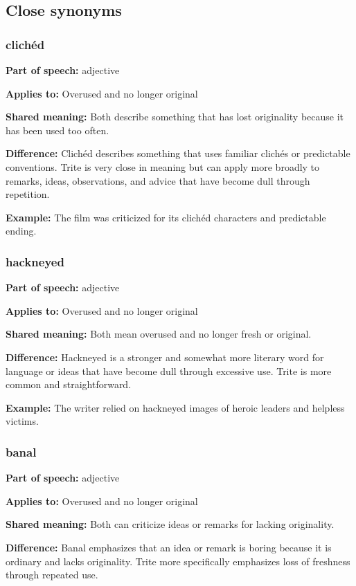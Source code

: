 \documentclass[11pt]{article}
\begin{document}
\subsection{Close synonyms}
\subsubsection{clichéd}
\textbf{Part of speech:} adjective

\textbf{Applies to:} Overused and no longer original

\textbf{Shared meaning:} Both describe something that has lost originality because it has been used too often.

\textbf{Difference:} Clichéd describes something that uses familiar clichés or predictable conventions. Trite is very close in meaning but can apply more broadly to remarks, ideas, observations, and advice that have become dull through repetition.

\textbf{Example:} The film was criticized for its clichéd characters and predictable ending.

\subsubsection{hackneyed}
\textbf{Part of speech:} adjective

\textbf{Applies to:} Overused and no longer original

\textbf{Shared meaning:} Both mean overused and no longer fresh or original.

\textbf{Difference:} Hackneyed is a stronger and somewhat more literary word for language or ideas that have become dull through excessive use. Trite is more common and straightforward.

\textbf{Example:} The writer relied on hackneyed images of heroic leaders and helpless victims.

\subsubsection{banal}
\textbf{Part of speech:} adjective

\textbf{Applies to:} Overused and no longer original

\textbf{Shared meaning:} Both can criticize ideas or remarks for lacking originality.

\textbf{Difference:} Banal emphasizes that an idea or remark is boring because it is ordinary and lacks originality. Trite more specifically emphasizes loss of freshness through repeated use.
\end{document}
